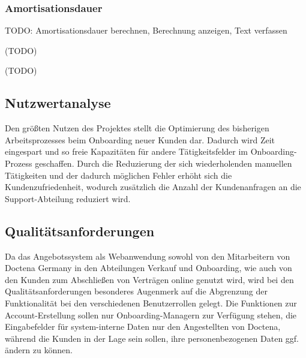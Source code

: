
\subsubsection{Amortisationsdauer}
\label{sec:Amortisationsdauer}

TODO: Amortisationsdauer berechnen, Berechnung anzeigen, Text verfassen

(TODO)

(TODO)

\subsection{Nutzwertanalyse}
\label{sec:Nutzwertanalyse}
Den größten Nutzen des Projektes stellt die Optimierung des bisherigen Arbeitsprozesses beim Onboarding neuer Kunden dar. Dadurch wird Zeit eingespart und so freie Kapazitäten für andere Tätigkeitsfelder im Onboarding-Prozess geschaffen. Durch die Reduzierung der sich wiederholenden manuellen Tätigkeiten und der dadurch möglichen Fehler erhöht sich die Kundenzufriedenheit, wodurch zusätzlich die Anzahl der Kundenanfragen an die Support-Abteilung reduziert wird.


\subsection{Qualitätsanforderungen}
\label{sec:Qualitaetsanforderungen}
Da das Angebotssystem als Webanwendung sowohl von den Mitarbeitern von Doctena Germany in den Abteilungen Verkauf und Onboarding, wie auch von den Kunden zum Abschließen von Verträgen online genutzt wird, wird bei den Qualitätsanforderungen besonderes Augenmerk auf die Abgrenzung der Funktionalität bei den verschiedenen Benutzerrollen gelegt. Die Funktionen zur Account-Erstellung sollen nur Onboarding-Managern zur Verfügung stehen, die Eingabefelder für system-interne Daten nur den Angestellten von Doctena, während die Kunden in der Lage sein sollen, ihre personenbezogenen Daten ggf. ändern zu können.

